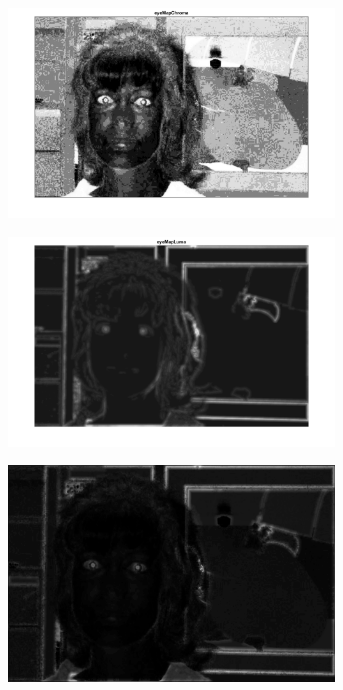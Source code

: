 \begin{figure}[H]
\centering

\begin{subfigure}{.33\textwidth}
  \centering
  \includegraphics[width=0.95\textwidth]{img/fd2/EyeMapChroma.png}
  \caption{}
\end{subfigure}%
\begin{subfigure}{.33\textwidth}
  \centering
  \includegraphics[width=0.95\textwidth]{img/fd2/EyeMapLuma.png}
  \caption{}
\end{subfigure}%
\begin{subfigure}{.33\textwidth}
  \centering
  \includegraphics[width=0.95\textwidth]{img/fd/OriginalEyeMap.png}
  \caption{}
\end{subfigure}%


\end{figure}
